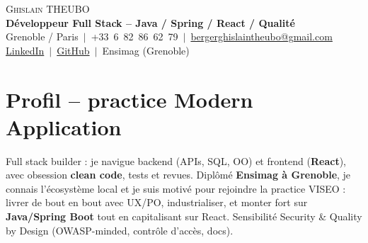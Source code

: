 \documentclass[a4paper,10.5pt]{article}
\begin{document}
\begin{center}
{\Huge \scshape Ghislain THEUBO}\\[3pt]
\textbf{D\'eveloppeur Full Stack -- Java / Spring / React / Qualit\'e}\\[2pt]
\small Grenoble / Paris $\,|\,$ +33~6~82~86~62~79 $\,|\,$ \href{mailto:bergerghislaintheubo@gmail.com}{bergerghislaintheubo@gmail.com}\\[1pt]
\href{https://www.linkedin.com/in/berger-ghislain}{LinkedIn} $\,|\,$ \href{https://github.com/Bergerghislain}{GitHub} $\,|\,$ Ensimag (Grenoble)
\end{center}

\section{Profil -- practice Modern Application}
\small{
Full stack builder : je navigue backend (APIs, SQL, OO) et frontend (\textbf{React}),
avec obsession \textbf{clean code}, tests et revues. Dipl\^om\'e \textbf{Ensimag \`a Grenoble},
je connais l'\'ecosyst\`eme local et je suis motiv\'e pour rejoindre la practice VISEO :
livrer de bout en bout avec UX/PO, industrialiser, et monter fort sur \textbf{Java/Spring Boot}
tout en capitalisant sur React. Sensibilit\'e Security \& Quality by Design (OWASP-minded,
contr\^ole d'acc\`es, docs).
}
\end{document}
